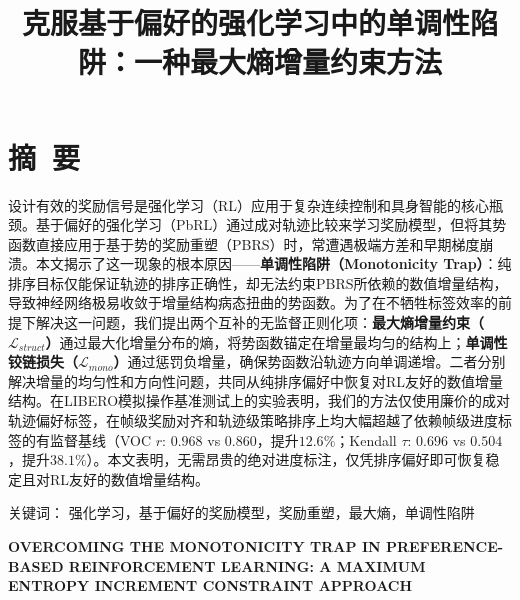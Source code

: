 

\renewcommand{\mytitle}{克服基于偏好的强化学习中的单调性陷阱：一种最大熵增量约束方法}
\renewcommand{\mytitleEN}{OVERCOMING THE MONOTONICITY TRAP IN PREFERENCE-BASED REINFORCEMENT LEARNING: A MAXIMUM ENTROPY INCREMENT CONSTRAINT APPROACH}


\setlength{\baselineskip}{20pt}

\title{\hei{}\bfseries\mytitle}
\maketitle
\thispagestyle{empty}
\clearpage



{\pagestyle{plain}
\tableofcontents
\clearpage}


\section*{摘~要}
设计有效的奖励信号是强化学习（RL）应用于复杂连续控制和具身智能的核心瓶颈。基于偏好的强化学习（PbRL）通过成对轨迹比较来学习奖励模型，但将其势函数直接应用于基于势的奖励重塑（PBRS）时，常遭遇极端方差和早期梯度崩溃。本文揭示了这一现象的根本原因——\textbf{单调性陷阱（Monotonicity Trap）}：纯排序目标仅能保证轨迹的排序正确性，却无法约束PBRS所依赖的数值增量结构，导致神经网络极易收敛于增量结构病态扭曲的势函数。为了在不牺牲标签效率的前提下解决这一问题，我们提出两个互补的无监督正则化项：\textbf{最大熵增量约束（$\mathcal{L}_{struct}$）}通过最大化增量分布的熵，将势函数锚定在增量最均匀的结构上；\textbf{单调性铰链损失（$\mathcal{L}_{mono}$）}通过惩罚负增量，确保势函数沿轨迹方向单调递增。二者分别解决增量的均匀性和方向性问题，共同从纯排序偏好中恢复对RL友好的数值增量结构。在LIBERO模拟操作基准测试上的实验表明，我们的方法仅使用廉价的成对轨迹偏好标签，在帧级奖励对齐和轨迹级策略排序上均大幅超越了依赖帧级进度标签的有监督基线（VOC $r$: $0.968$ vs $0.860$，提升$12.6\%$；Kendall $\tau$: $0.696$ vs $0.504$，提升$38.1\%$）。本文表明，无需昂贵的绝对进度标注，仅凭排序偏好即可恢复稳定且对RL友好的数值增量结构。

\vspace{1em}\noindent
{\hei 关键词：}
{\song 强化学习，基于偏好的奖励模型，奖励重塑，最大熵，单调性陷阱}
\clearpage



{\centering{}\bfseries\sffamily \mytitleEN\par}
\vspace{1em}
